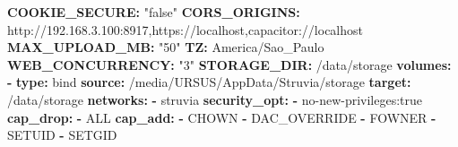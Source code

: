 \documentclass[
  10pt,
]{article}
\newenvironment{Shaded}{\begin{snugshade}}{\end{snugshade}}
\newcommand{\AttributeTok}[1]{\textcolor[rgb]{0.13,0.29,0.53}{#1}}
\newcommand{\FunctionTok}[1]{\textcolor[rgb]{0.13,0.29,0.53}{\textbf{#1}}}
\newcommand{\KeywordTok}[1]{\textcolor[rgb]{0.13,0.29,0.53}{\textbf{#1}}}
\newcommand{\StringTok}[1]{\textcolor[rgb]{0.31,0.60,0.02}{#1}}
\begin{document}
\begin{Shaded}
\begin{Highlighting}[]
\AttributeTok{      }\FunctionTok{COOKIE\_SECURE}\KeywordTok{:}\AttributeTok{ }\StringTok{"false"}
\AttributeTok{      }\FunctionTok{CORS\_ORIGINS}\KeywordTok{:}\AttributeTok{ http://192.168.3.100:8917,https://localhost,capacitor://localhost}
\AttributeTok{      }\FunctionTok{MAX\_UPLOAD\_MB}\KeywordTok{:}\AttributeTok{ }\StringTok{"50"}
\AttributeTok{      }\FunctionTok{TZ}\KeywordTok{:}\AttributeTok{ America/Sao\_Paulo}
\AttributeTok{      }\FunctionTok{WEB\_CONCURRENCY}\KeywordTok{:}\AttributeTok{ }\StringTok{"3"}
\AttributeTok{      }\FunctionTok{STORAGE\_DIR}\KeywordTok{:}\AttributeTok{ /data/storage}
\AttributeTok{    }\FunctionTok{volumes}\KeywordTok{:}
\AttributeTok{      }\KeywordTok{{-}}\AttributeTok{ }\FunctionTok{type}\KeywordTok{:}\AttributeTok{ bind}
\AttributeTok{        }\FunctionTok{source}\KeywordTok{:}\AttributeTok{ /media/URSUS/AppData/Struvia/storage}
\AttributeTok{        }\FunctionTok{target}\KeywordTok{:}\AttributeTok{ /data/storage}
\AttributeTok{    }\FunctionTok{networks}\KeywordTok{:}
\AttributeTok{      }\KeywordTok{{-}}\AttributeTok{ struvia}
\AttributeTok{    }\FunctionTok{security\_opt}\KeywordTok{:}
\AttributeTok{      }\KeywordTok{{-}}\AttributeTok{ no{-}new{-}privileges:true}
\AttributeTok{    }\FunctionTok{cap\_drop}\KeywordTok{:}
\AttributeTok{      }\KeywordTok{{-}}\AttributeTok{ ALL}
\AttributeTok{    }\FunctionTok{cap\_add}\KeywordTok{:}
\AttributeTok{      }\KeywordTok{{-}}\AttributeTok{ CHOWN}
\AttributeTok{      }\KeywordTok{{-}}\AttributeTok{ DAC\_OVERRIDE}
\AttributeTok{      }\KeywordTok{{-}}\AttributeTok{ FOWNER}
\AttributeTok{      }\KeywordTok{{-}}\AttributeTok{ SETUID}
\AttributeTok{      }\KeywordTok{{-}}\AttributeTok{ SETGID}


\end{Highlighting}
\end{Shaded}
\end{document}
